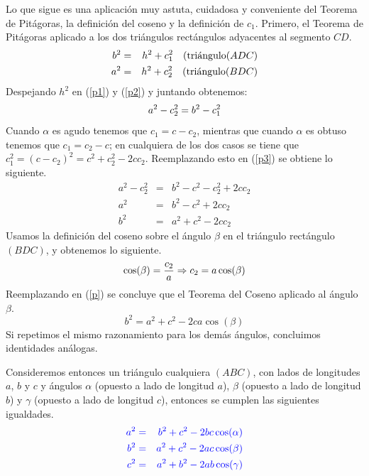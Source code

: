 Lo que sigue es una aplicación muy astuta, cuidadosa y conveniente del Teorema de Pitágoras, la definición del coseno y la definición de $c_1$.
Primero, el Teorema de Pitágoras aplicado a los dos triángulos rectángulos adyacentes al segmento $CD$.
\begin{eqnarray}
b^2&=&h^2+c_1^2\label{c1}\quad (\textup{triángulo} (ADC)\label{p1}\\
a^2&=&h^2+c_2^2\label{c2}\quad (\textup{triángulo} (BDC)\label{p2}
\end{eqnarray}
Despejando $h^2$ en (\ref{p1}) y (\ref{p2}) y juntando obtenemos:
\begin{equation}\label{p3}
a^2-c_2^2=b^2- c_1^2\\
\end{equation}
Cuando $\alpha$ es agudo tenemos que $c_1=c-c_2$, mientras que cuando $\alpha$ es obtuso tenemos que $c_1=c_2-c$; en cualquiera de los dos casos se tiene que $c_1^2=(c-c_2)^2=c^2+c_2^2-2cc_2$.
Reemplazando esto en (\ref{p3}) se obtiene lo siguiente.
\begin{eqnarray}\label{p}
a^2-c_2^2&=&b^2-c^2-c_2^2+2cc_2\\
a^2&=&b^2-c^2+2cc_2\\
b^2&=& a^2+c^2-2cc_2\label{p}
\end{eqnarray}
Usamos la definición del coseno sobre el ángulo $\beta$ en el triángulo rectángulo $(BDC)$, y obtenemos lo siguiente.
\[
\cos(\beta) = \frac{c_2}{ a} \Rightarrow c_2 = a\cos(\beta)
\]
Reemplazando en (\ref{p}) se concluye que el Teorema del Coseno aplicado al ángulo $\beta$.
$$b^2=a^2+c^2-2ca\cos(\beta)$$
Si repetimos el mismo razonamiento para los demás ángulos, concluimos identidades análogas.
\begin{thm}
Consideremos entonces un tri\'angulo cualquiera $(ABC)$, con lados de longitudes $a$, $b$ y $c$ y \'angulos $\alpha$ (opuesto a lado de longitud $a$), $\beta$ (opuesto a lado de longitud $b$) y $\gamma$ (opuesto a lado de longitud $c$), entonces se cumplen las siguientes igualdades.
\begin{eqnarray*}
\color{blue}{a^2}&\color{blue}=&\color{blue}{b^2+c^2-2bc\cos(\alpha)}\\
\color{blue}{b^2}&\color{blue}=&\color{blue}{a^2+c^2-2ac\cos(\beta)}\\
\color{blue}{c^2}&\color{blue}=&\color{blue}{a^2+b^2-2ab\cos(\gamma)}
\end{eqnarray*}
\end{thm}



